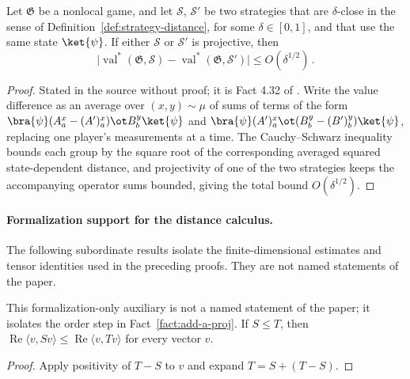 \begin{lemma}\label{lem:close-strategies-have-close-values}
	\leanok
	Let $\mathfrak G$ be a nonlocal game, and let $\mathcal S$, $\mathcal S'$ be two strategies that are $\delta$-close in the sense of Definition~\ref{def:strategy-distance}, for some $\delta \in [0,1]$, and that use the same state $\ket{\psi}$. If either $\mathcal S$ or $\mathcal S'$ is projective, then
	\[
		\bigl| \operatorname{val}^*(\mathfrak G, \mathcal S) - \operatorname{val}^*(\mathfrak G, \mathcal S') \bigr| \le O(\delta^{1/2})\,.
	\]
\end{lemma}
\begin{proof}
	\leanok
	Stated in the source without proof; it is Fact 4.32 of \cite{Natarajan2018NEEXP}. Write the value difference as an average over $(x,y) \sim \mu$ of sums of terms of the form $\bra{\psi} (A^x_a - (A')^x_a) \ot B^y_b \ket{\psi}$ and $\bra{\psi} (A')^x_a \ot (B^y_b - (B')^y_b) \ket{\psi}$, replacing one player's measurements at a time. The Cauchy--Schwarz inequality bounds each group by the square root of the corresponding averaged squared state-dependent distance, and projectivity of one of the two strategies keeps the accompanying operator sums bounded, giving the total bound $O(\delta^{1/2})$.
\end{proof}

\paragraph{Formalization support for the distance calculus.}
The following subordinate results isolate the finite-dimensional estimates and
tensor identities used in the preceding proofs. They are not named statements
of the paper.

\begin{lemma}
	\label{lem:distance-quadratic-form-mono}
	\leanok
	This formalization-only auxiliary is not a named statement of the paper; it
	isolates the order step in Fact~\ref{fact:add-a-proj}. If $S \leq T$, then
	$\operatorname{Re}\langle v,Sv\rangle \leq
	\operatorname{Re}\langle v,Tv\rangle$ for every vector $v$.
\end{lemma}
\begin{proof}
	\leanok
	Apply positivity of $T-S$ to $v$ and expand $T=S+(T-S)$.
\end{proof}

